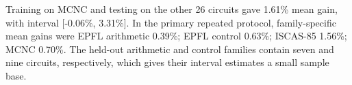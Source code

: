 Training on MCNC and testing on the other 26 circuits gave 1.61\% mean gain, with interval [-0.06\%, 3.31\%]. In the primary repeated protocol, family-specific mean gains were EPFL arithmetic 0.39\%; EPFL control 0.63\%; ISCAS-85 1.56\%; MCNC 0.70\%. The held-out arithmetic and control families contain seven and nine circuits, respectively, which gives their interval estimates a small sample base.
